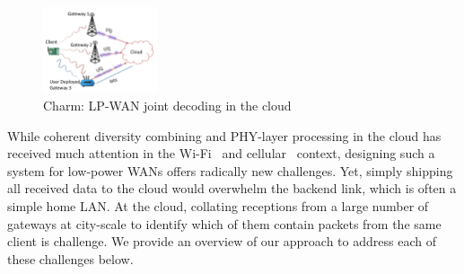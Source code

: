 
\begin{figure}
    \centering
    \includegraphics[width=0.30\textwidth]{figures/LoRaRAN.pdf}
        \vspace*{-0.1in}
    \caption{Charm: LP-WAN joint decoding in the cloud}
    \vspace*{-0.1in}
    \label{fig:my_label}
    \compactimg
\end{figure}

While coherent diversity combining and PHY-layer processing in the cloud has
received much attention in the Wi-Fi~\cite{tan2009sam, xie2014scalable} and
cellular~\cite{checko2015cloud, wubben2014benefits} context, designing such a
system for low-power WANs offers radically new challenges. 
 Yet, simply shipping all received data to the
cloud would overwhelm the backend link, which is often  a simple home LAN. At
the cloud, collating receptions from a large number of gateways at city-scale
to identify which of them contain packets from the same client is  challenge.
We provide an overview of our approach to address each of these challenges
below. 


